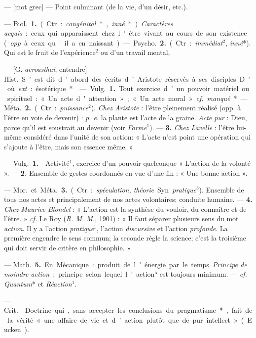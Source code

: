 \begin{itemize}[leftmargin=1cm, label=, itemsep=1pt]
 — [mot grec] — Point culminant
(de la vie, d’un désir, etc.).

 — \si{Biol.} {\bf 1.} (Ctr. : {\it congénital}*,
{\it inné}*). {\it Caractères acquis} : ceux qui
apparaissent chez l’être vivant au
cours de son existence ({\it opp}. à ceux
qu'il a en naissant).

— \si{Psycho.} {\bf 2.} (Ctr. : {\it immédiat}$^2$,
{\it inné}*). Qui est le fruit de l’expérience$^2$ ou d’un travail mental,

 — [G. {\it acroasthai}, entendre] — \si{Hist.} S’est dit d’abord des
écrits d’Aristote réservés à ses disciples. D’où {\it ext}. : ésotérique*.

 — \si{Vulg.} {\bf 1.} Tout exercice d’un
pouvoir matériel ou spirituel : « Un
acte d'attention »; « Un acte moral ».
{\it cf.}  {\it manqué}*.

— \si{Méta.} {\bf 2.} (Ctr.: {\it puissance}$^2$). {\it Chez
Aristote} : l'être pleinement réalisé
(opp. à l'être en voie de devenir) :
{\it p. e.} la plante est l'acte de la graine.
{\it Acte pur} : Dieu, parce qu’il est soustrait au devenir (voir {\it Forme}$^1$). —
 {\bf 3.} {\it Chez Lavelle} : l'être lui-même
considéré dans l’unité de son action:
« L'acte n’est point une opération
qui s'ajoute à l'être, mais son
essence même. »

 — \si{Vulg.} {\bf 1.}  Activité$^1$, exercice d’un pouvoir quelconque
« L'action de la volonté ». — {\bf 2.} 
Ensemble de gestes coordonnés
en vue d'une fin : « Une bonne
action ».

— \si{Mor.} et \si{Méta.} {\bf 3.} (Ctr. : {\it spéculation, théorie}. Syn. {\it pratique}$^3$).
Ensemble de tous nos actes et principalement de nos actes volontaires;
conduite humaine. — {\bf 4.} {\it Chez Maurice Blondel} : « L'action est la
synthèse du vouloir, du connaître et de
l'être. » {\it cf.}  Le Roy ({\it R. M. M.}, 1901) :
« Il faut séparer plusieurs sens du
mot {\it action}. Il y a l’action {\it pratique}$^1$,
l’action {\it discursive} et l'action {\it profonde}. La première engendre le sens
commun; la seconde règle la science;
c’est la troisième qui doit servir de
critère en philosophie. »

— \si{Math.} {\bf 5.} En Mécanique : produit de l'énergie par le temps.
{\it Principe de moindre action} : principe
selon lequel l’action$^5$ est toujours
minimum. — {\it cf.}  {\it Quantum}* et
{\it Réaction}$^1$.

 — \si{Crit.}  Doctrine qui, 
sans accepter les conclusions du
pragmatisme*, fait de la vérité
« une affaire de vie et d’action plutôt
que de pur intellect » (Eucken).


\end{itemize}
